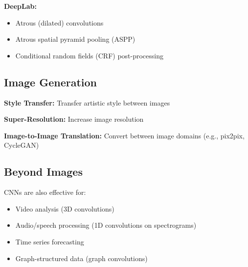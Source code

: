 \textbf{DeepLab:}
\begin{itemize}
    \item Atrous (dilated) convolutions
    \item Atrous spatial pyramid pooling (ASPP)
    \item Conditional random fields (CRF) post-processing
\end{itemize}

\subsection{Image Generation}

\textbf{Style Transfer:} Transfer artistic style between images

\textbf{Super-Resolution:} Increase image resolution

\textbf{Image-to-Image Translation:} Convert between image domains (e.g., pix2pix, CycleGAN)

\subsection{Beyond Images}

CNNs are also effective for:
\begin{itemize}
    \item Video analysis (3D convolutions)
    \item Audio/speech processing (1D convolutions on spectrograms)
    \item Time series forecasting
    \item Graph-structured data (graph convolutions)
\end{itemize}
